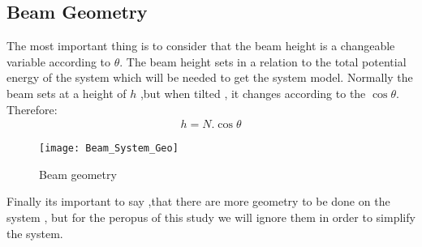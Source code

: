 \subsection{Beam Geometry}
The most important thing is to consider that the beam height is a changeable variable according to $\theta$.
The beam height sets in a relation to the total potential energy of the system which will be needed to get the system model.
Normally the beam  sets at a height of $h$ ,but when tilted , it changes according to the $\cos{\theta}$.
Therefore:
\begin{equation}
	\begin{split}
		h = N.\cos{\theta}
	\end{split}
\end{equation}
\begin{figure}[h]
	\centering
	\texttt{[image: Beam\_System\_Geo]}
	\caption{Beam geometry}\label{Beam_System_Geo}
\end{figure}

\noindent Finally its important to say ,that there are more geometry to be done on the system , but for the peropus of this study we will ignore them in order to simplify the system.
